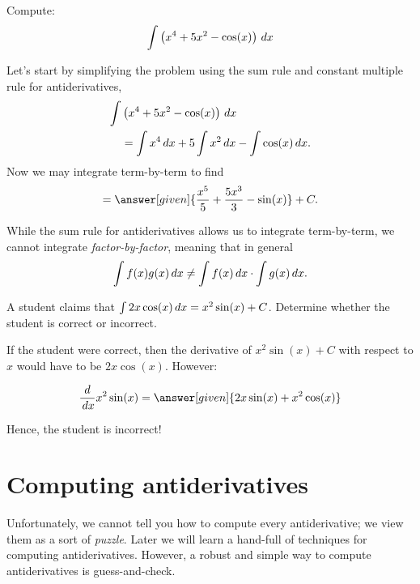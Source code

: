 \documentclass{ximera}
\begin{document}
\begin{example}
	Compute:
	\[
	\int \left(x^4 + 5x^2 - \cos(x)\right) \,d x
	\]
	\begin{explanation}
		Let's start by simplifying the problem using the sum rule 
		 and constant multiple rule for antiderivatives, 
		\begin{align*}
			\int &\left(x^4 + 5x^2 - \cos(x)\right) \,d x\\
				&= \int x^4 \,d x + 5\int x^2 \,d x - \int \cos(x) \,d x.
		\end{align*}
		Now we may integrate term-by-term to find
		\[
		= \answer[given]{\frac{x^5}{5} + \frac{5x^3}{3}  - \sin(x)}+C.
		\]
	\end{explanation}
\end{example}


\begin{warning}
	While the sum rule for antiderivatives allows us to integrate
	term-by-term, we cannot integrate \textit{factor-by-factor}, meaning
	that in general
	\[
	\int f(x)g(x) \,d x \ne \int f(x) \,d x\cdot \int g(x) \,d x.
	\]
\end{warning}


\begin{example}
  A student claims that $\int 2x \cos(x) \,d x = x^2 \sin(x) +C$.  Determine whether the student is correct or incorrect.
  
  \begin{explanation}
    If the student were correct, then the derivative of $x^2 \sin(x) +C$ with respect to $x$ would have to be $2x \cos(x)$.  However:
    
      \[\ddx x^2 \sin(x) = \answer[given]{2x \sin(x) +x^2 \cos(x)} \]
      
 Hence, the student is incorrect!
  \end{explanation}
\end{example}






\section{Computing antiderivatives}


Unfortunately, we cannot tell you how to compute every antiderivative;
we view them as a sort of \textit{puzzle}. Later we will learn a
hand-full of techniques for computing antiderivatives. However, a
robust and simple way to compute antiderivatives is guess-and-check.
\end{document}
